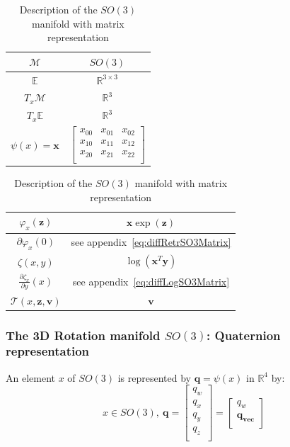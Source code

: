 \begin{table} [H]
\caption{Description of the $SO(3)$ manifold with matrix representation}
\centering
\begin{tabular}{cc}
  \toprule
  $\mathcal{M}$ & $SO(3)$ \\
  \midrule
  $\mathbb{E}$ & $\mathbb{R}^{3\times 3}$ \\
  \midrule
  $T_x\mathcal{M}$ & $\mathbb{R}^3$ \\
  \midrule
  $T_x\mathbb{E}$ & $\mathbb{R}^3$ \\
  \midrule
  $\psi(x) = \mathbf{x}$ & $ \begin{bmatrix}
    x_{00} & x_{01} & x_{02} \\
    x_{10} & x_{11} & x_{12} \\
    x_{20} & x_{21} & x_{22} \\
  \end{bmatrix} $ \\
  \bottomrule
\end{tabular}
\quad
\begin{tabular}{cc}
  \toprule
  $\varphi_x(\mathbf{z})$ & $\mathbf{x}\exp(\mathbf{z})$ \\
  \midrule
  $\partial \varphi_x(0)$ & see appendix~\ref{eq:diffRetrSO3Matrix} \\
  \midrule
  $\zeta(x,y)$ & $\log(\mathbf{x}^T\mathbf{y})$ \\
  \midrule
  $\frac{\partial \zeta_x}{\partial y}(x)$ & see appendix~\ref{eq:diffLogSO3Matrix} \\
  \midrule
  $\mathcal{T}(x,\mathbf{z}, \mathbf{v})$ & $\mathbf{v}$ \\
  \bottomrule
\end{tabular}
\end{table}

\subsubsection{The 3D Rotation manifold $SO(3)$: Quaternion representation}
\label{ssub:the_3d_rotation_manifold_quaternion_representation}
An element $x$ of $SO(3)$ is represented by $\mathbf{q}=\psi(x)$ in $\mathbb{R}^{4}$ by:
\begin{equation}
  x\in SO(3),\ \mathbf{q} =\begin{bmatrix}
    q_{w}\\
    q_{x}\\
    q_{y}\\
    q_{z}\\
  \end{bmatrix}
  =\begin{bmatrix}
    q_{w}\\
    \mathbf{q_{vec}}\\
  \end{bmatrix}
\end{equation}

